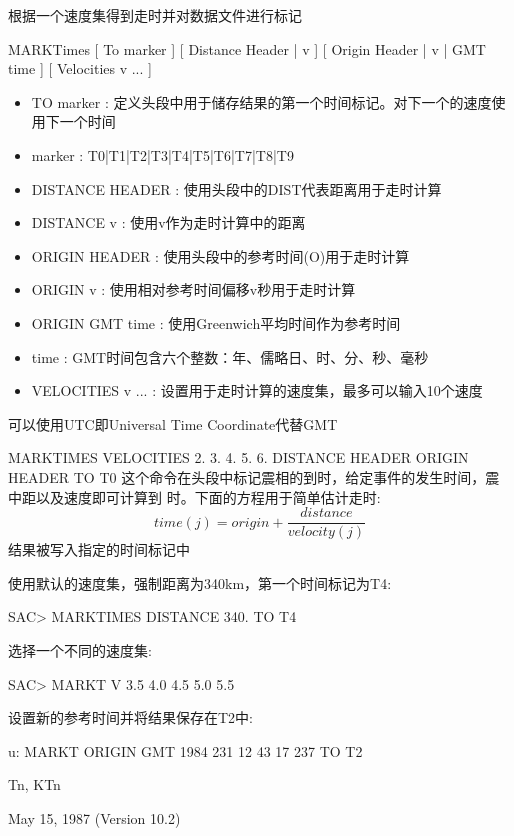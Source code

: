 \label{cmd:marktimes}

根据一个速度集得到走时并对数据文件进行标记

MARKTimes [ To marker ] [ Distance Header | v ] [ Origin Header | v | GMT time ] [ Velocities v ... ]

\begin{itemize}
\item TO marker : 定义头段中用于储存结果的第一个时间标记。对下一个的速度使用下一个时间 
\item marker :  T0|T1|T2|T3|T4|T5|T6|T7|T8|T9 
\item DISTANCE HEADER : 使用头段中的DIST代表距离用于走时计算 
\item DISTANCE v : 使用v作为走时计算中的距离 
\item ORIGIN HEADER : 使用头段中的参考时间(O)用于走时计算 
\item ORIGIN v : 使用相对参考时间偏移v秒用于走时计算 
\item ORIGIN GMT time : 使用Greenwich平均时间作为参考时间 
\item time :  GMT时间包含六个整数：年、儒略日、时、分、秒、毫秒 
\item VELOCITIES v ... : 设置用于走时计算的速度集，最多可以输入10个速度 
\end{itemize}

可以使用UTC即Universal Time Coordinate代替GMT

MARKTIMES VELOCITIES 2. 3. 4. 5. 6.  DISTANCE HEADER ORIGIN HEADER TO T0
这个命令在头段中标记震相的到时，给定事件的发生时间，震中距以及速度即可计算到	时。下面的方程用于简单估计走时:
 		\[ time(j) = origin + \frac{distance}{velocity(j)} \]
结果被写入指定的时间标记中

使用默认的速度集，强制距离为340km，第一个时间标记为T4:
\begin{SACCode}
SAC> MARKTIMES DISTANCE 340. TO T4
\end{SACCode}

选择一个不同的速度集:
\begin{SACCode}
SAC> MARKT V 3.5 4.0 4.5 5.0 5.5
\end{SACCode}

设置新的参考时间并将结果保存在T2中:
\begin{SACCode}
u: MARKT ORIGIN GMT 1984 231 12 43 17 237 TO T2
\end{SACCode}

Tn, KTn

May 15, 1987 (Version 10.2)

